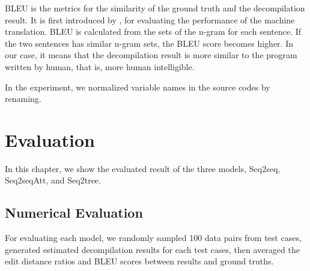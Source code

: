 \documentclass[senior,final,11pt]{iscs-thesis}
\begin{document}
BLEU is the metrics for the similarity of the ground truth and the decompilation result. 
It is first introduced by \citet{BLEU}, for evaluating the performance of the machine translation.
BLEU is calculated from the sets of the n-gram for each sentence. 
If the two sentences has similar n-gram sets, the BLEU score becomes higher.
In our case, it means that the decompilation result is more similar to the program written by human, that is, more human intelligible.


In the experiment, we normalized variable names in the source codes by renaming. 

\chapter{Evaluation}
In this chapter, we show the evaluated result of the three models, Seq2seq, Seq2seqAtt, and Seq2tree.








\section{Numerical Evaluation}
For evaluating each model, we randomly sampled 100 data pairs from test cases, generated estimated decompilation results for each test cases,
then averaged the edit distance ratios and BLEU scores between results and ground truths.
\end{document}
